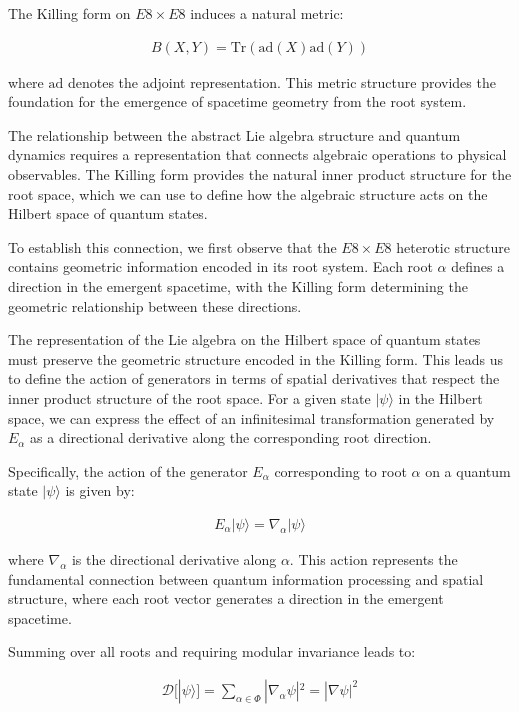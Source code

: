 \documentclass[11pt,english,twoside]{article}
\begin{document}
The Killing form on $E8\times E8$ induces a natural metric:

\begin{align}
    B(X,Y) = \text{Tr}(\text{ad}(X)\text{ad}(Y))
\end{align}

where $\text{ad}$ denotes the adjoint representation. This metric structure provides the foundation for the emergence of spacetime geometry from the root system.

The relationship between the abstract Lie algebra structure and quantum dynamics requires a representation that connects algebraic operations to physical observables. The Killing form provides the natural inner product structure for the root space, which we can use to define how the algebraic structure acts on the Hilbert space of quantum states.

To establish this connection, we first observe that the $E8\times E8$ heterotic structure contains geometric information encoded in its root system. Each root $\alpha$ defines a direction in the emergent spacetime, with the Killing form determining the geometric relationship between these directions. 

The representation of the Lie algebra on the Hilbert space of quantum states must preserve the geometric structure encoded in the Killing form. This leads us to define the action of generators in terms of spatial derivatives that respect the inner product structure of the root space. For a given state $|\psi\rangle$ in the Hilbert space, we can express the effect of an infinitesimal transformation generated by $E_\alpha$ as a directional derivative along the corresponding root direction.

Specifically, the action of the generator $E_\alpha$ corresponding to root $\alpha$ on a quantum state $|\psi\rangle$ is given by:

\begin{align}
    E_\alpha|\psi\rangle = \nabla_\alpha|\psi\rangle
\end{align}

where $\nabla_\alpha$ is the directional derivative along $\alpha$. This action represents the fundamental connection between quantum information processing and spatial structure, where each root vector generates a direction in the emergent spacetime.

Summing over all roots and requiring modular invariance leads to:

\begin{align}
    \mathcal{D}[|\psi\rangle] = \sum_{\alpha \in \Phi} |\nabla_\alpha\psi|^2 = |\nabla\psi|^2
\end{align}
\end{document}
